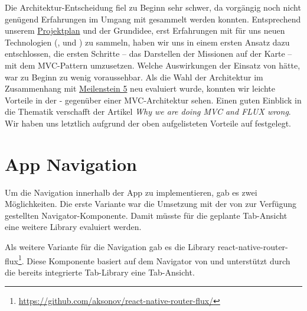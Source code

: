 Die Architektur-Entscheidung fiel zu Beginn sehr schwer, da vorgängig noch nicht genügend Erfahrungen im Umgang mit  gesammelt werden konnten.
Entsprechend unserem \hyperref[pm-projektplan]{Projektplan} und der Grundidee, erst Erfahrungen mit für uns neuen Technologien (,  und ) zu sammeln, haben wir uns in einem ersten Ansatz dazu entschlossen, die ersten Schritte -- das Darstellen der Missionen auf der Karte -- mit dem \gls{MVC}-Pattern umzusetzen.
Welche Auswirkungen der Einsatz von  hätte, war zu Beginn zu wenig voraussehbar.\newline
Als die Wahl der Architektur im Zusammenhang mit \hyperref[pm-ms5]{Meilenstein 5} neu evaluiert wurde, konnten wir leichte Vorteile in der - gegenüber einer MVC-Architektur sehen.
Einen guten Einblick in die Thematik verschafft der Artikel \emph{Why we are doing MVC and FLUX wrong}\cite{mvc-vs-flux}.\newline
Wir haben uns letztlich aufgrund der oben aufgelisteten Vorteile auf  festgelegt.

\section{App Navigation}
Um die Navigation innerhalb der App zu implementieren, gab es zwei Möglichkeiten. 
Die erste Variante war die Umsetzung mit der von  zur Verfügung gestellten Navigator-Komponente. 
Damit müsste für die geplante Tab-Ansicht eine weitere \gls{Library} evaluiert werden. 

Als weitere Variante für die Navigation gab es die Library react-native-router-flux\footnote{\url{https://github.com/aksonov/react-native-router-flux/}}.
Diese Komponente basiert auf dem Navigator von  und unterstützt durch die bereits integrierte Tab-Library eine Tab-Ansicht.  

